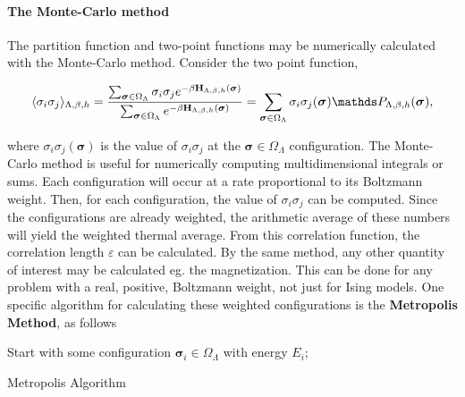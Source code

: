\documentclass{homework}
\begin{document}
\clearpage

\paragraph{\textbf{The Monte-Carlo method}}

The partition function and two-point functions may be numerically calculated with the Monte-Carlo method. Consider the two point function, 

\begin{equation}
    \langle \sigma_i \sigma_j \rangle_{\Lambda, \beta, h} = \frac{\sum_{{\bm \sigma} \in \Omega_{\Lambda}} \sigma_i \sigma_j e^{-\beta {\bf H}_{\Lambda, \beta, h}({\bm \sigma})}}{\sum_{{\bm \sigma} \in \Omega_{\Lambda}} e^{-\beta {\bf H}_{\Lambda, \beta, h}({\bm \sigma})}} = \sum_{{\bm \sigma} \in \Omega_{\Lambda}} \sigma_i \sigma_j({\bm \sigma}) \prob_{\Lambda, \beta, h}{({\bm \sigma})},
\end{equation}

where $\sigma_i \sigma_j({\bm \sigma})$ is the value of $\sigma_i \sigma_j$ at the ${\bm \sigma} \in \Omega_{\Lambda}$ configuration. The Monte-Carlo method is useful for numerically computing multidimensional integrals or sums. Each configuration will occur at a rate proportional to its Boltzmann weight. Then, for each configuration, the value of $\sigma_i \sigma_j$ can be computed. Since the configurations are already weighted, the arithmetic average of these numbers will yield the weighted thermal average. From this correlation function, the correlation length $\varepsilon$ can be calculated. By the same method, any other quantity of interest may be calculated eg. the magnetization. This can be done for any problem with a real, positive, Boltzmann weight, not just for Ising models. One specific algorithm for calculating these weighted configurations is the \textbf{Metropolis Method}, as follows \\

\begin{algorithm}[H]
 \KwResult{}
 Start with some configuration ${\bm \sigma}_i \in \Omega_{\Lambda}$ with energy $E_i$;\
 \caption{Metropolis Algorithm}
\end{algorithm}
\end{document}
